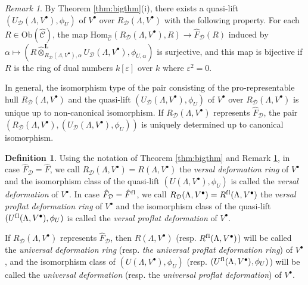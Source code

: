 \documentclass{amsart}
\theoremstyle{plain}
\theoremstyle{definition}
\newtheorem{dfn}[thm]{Definition}
\theoremstyle{remark}
\newtheorem{rem}[thm]{Remark}
\begin{document}
\begin{rem}
\label{rem:newrem}
By Theorem \ref{thm:bigthm}(i), there exists 
a quasi-lift $(U_{\mathcal{D}}(\Lambda,V^\bullet),\phi_U)$ of $V^\bullet$ over $R_{\mathcal{D}}(\Lambda,V^\bullet)$ 
with the following property. For each $R\in \mathrm{Ob}(\hat{\mathcal{C}})$, the map
$\mathrm{Hom}_{\hat{\mathcal{C}}}(R_{\mathcal{D}}(\Lambda,V^\bullet),R) \to \hat{F}_{\mathcal{D}}(R)$ 
induced by $\alpha \mapsto (R\hat{\otimes}^{\mathbf{L}}_{R_{\mathcal{D}}(\Lambda,V^\bullet),\alpha} U_{\mathcal{D}}(\Lambda,V^\bullet),\phi_{U,\alpha})$ is surjective,
and this map is bijective if $R$ is the ring of dual numbers $k[\varepsilon]$ over $k$
where $\varepsilon^2=0$.

In general,
the isomorphism type of the pair consisting of the
pro-representable hull $R_{\mathcal{D}}(\Lambda,V^\bullet)$ 
and the quasi-lift $(U_{\mathcal{D}}(\Lambda,V^\bullet),\phi_U)$ of $V^\bullet$ over $R_{\mathcal{D}}(\Lambda,V^\bullet)$ is
unique up to non-canonical isomorphism.
If $R_{\mathcal{D}}(\Lambda,V^\bullet)$ represents $\hat{F}_{\mathcal{D}}$,
the pair $(R_{\mathcal{D}}(\Lambda,V^\bullet),(U_{\mathcal{D}}(\Lambda,V^\bullet),\phi_U))$ is uniquely determined up 
to canonical isomorphism.
\end{rem}

\begin{dfn}
\label{def:newdef}
Using the notation of Theorem \ref{thm:bigthm} and Remark \ref{rem:newrem}, 
in case $\hat{F}_{\mathcal{D}}=\hat{F}$, we call 
$R_{\mathcal{D}}(\Lambda,V^\bullet)=R(\Lambda,V^\bullet)$
the \emph{versal deformation ring} of $V^\bullet$ and the isomorphism class of the quasi-lift 
$(U(\Lambda,V^\bullet),\phi_U)$ is called the \emph{versal deformation} of $V^\bullet$.
In case $\hat{F}_{\mathcal{D}}=\hat{F}^{\mathrm{f\/l}}$,
we call $R_{\mathcal{D}}(\Lambda,V^\bullet)=R^{\mathrm{f\/l}}(\Lambda,V^\bullet)$ the 
\emph{versal proflat deformation ring} of $V^\bullet$ and 
the isomorphism class of the quasi-lift $(U^{\mathrm{f\/l}}(\Lambda,V^\bullet),\phi_U)$ is called
the \emph{versal proflat deformation} of $V^\bullet$.

If $R_{\mathcal{D}}(\Lambda,V^\bullet)$ represents $\hat{F}_{\mathcal{D}}$, then
$R(\Lambda,V^\bullet)$ (resp. $R^{\mathrm{f\/l}}(\Lambda,V^\bullet)$) will be
called the \emph{universal deformation ring} (resp. \emph{the universal proflat deformation ring})
of $V^\bullet$, and the isomorphism class of
$(U(\Lambda,V^\bullet),\phi_U)$ (resp. $(U^{\mathrm{f\/l}}(\Lambda,V^\bullet),\phi_U)$) will be called the
\emph{universal deformation} (resp. the \emph{universal proflat deformation}) of $V^\bullet$.
\end{dfn}
\end{document}
